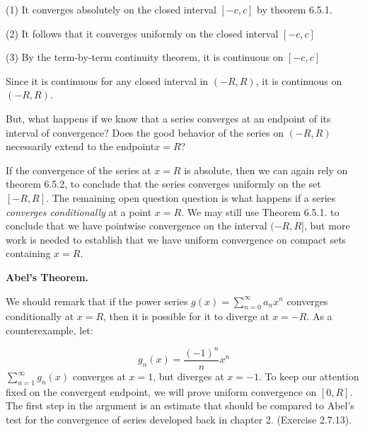 \documentclass[10pt]{article}
\begin{document}
(1) It converges absolutely on the closed interval $\displaystyle [ -c,c]$ by theorem 6.5.1.

(2) It follows that it converges uniformly on the closed interval $\displaystyle [ -c,c]$

(3) By the term-by-term continuity theorem, it is continuous on $\displaystyle [ -c,c]$



Since it is continuous for any closed interval in $\displaystyle ( -R,R)$, it is continuous on \ $\displaystyle ( -R,R)$.



But, what happens if we know that a series converges at an endpoint of its interval of convergence? Does the good behavior of the series on $\displaystyle ( -R,R)$ necessarily extend to the endpoint$\displaystyle x=R$?



If the convergence of the series at $\displaystyle x=R$ is absolute, then we can again rely on theorem 6.5.2, to conclude that the series converges uniformly on the set $\displaystyle [ -R,R]$. The remaining open question question is what happens if a series \textit{converges conditionally} at a point $\displaystyle x=R$. We may still use Theorem 6.5.1. to conclude that we have pointwise convergence on the interval $\displaystyle ( -R,R]$, but more work is needed to establish that we have uniform convergence on compact sets containing $\displaystyle x=R$.



\textbf{Abel's Theorem.}



We should remark that if the power series $\displaystyle g( x) =\sum _{n=0}^{\infty } a_{n} x^{n}$ converges conditionally at $\displaystyle x=R$, then it is possible for it to diverge at $\displaystyle x=-R$. As a counterexample, let:


\begin{equation*}
g_{n}( x) =\frac{( -1)^{n}}{n} x^{n}
\end{equation*}
$\displaystyle \sum _{n=1}^{\infty } g_{n}( x)$ converges at $\displaystyle x=1$, but diverges at $\displaystyle x=-1$. To keep our attention fixed on the convergent endpoint, we will prove uniform convergence on $\displaystyle [ 0,R]$. The first step in the argument is an estimate that should be compared to Abel's test for the convergence of series developed back in chapter 2. (Exercise 2.7.13).
\end{document}

